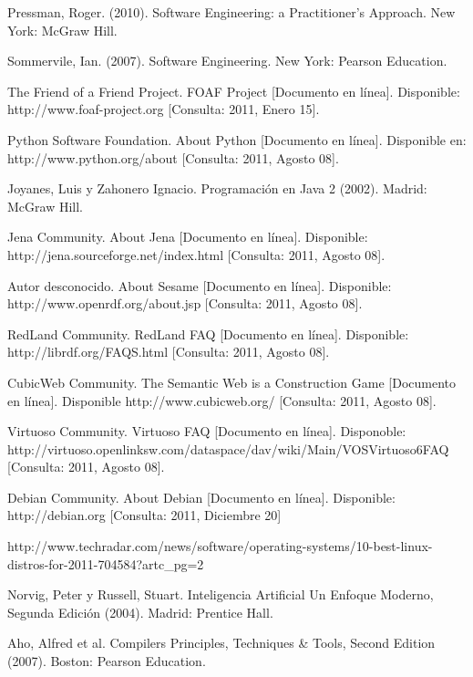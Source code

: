 \begin{thebibliography}{20}
 Pressman, Roger. (2010). Software Engineering: a Practitioner's Approach. New York: McGraw Hill.

 Sommervile, Ian. (2007). Software Engineering. New York: Pearson Education.

 The Friend of a Friend Project. FOAF Project [Documento en línea]. Disponible: http://www.foaf-project.org [Consulta: 2011, Enero 15].

 Python Software Foundation. About Python [Documento en línea]. Disponible en: http://www.python.org/about [Consulta: 2011, Agosto 08].

 Joyanes, Luis y Zahonero Ignacio. Programación en Java 2 (2002). Madrid: McGraw Hill.

 Jena Community. About Jena [Documento en línea]. Disponible: http://jena.sourceforge.net/index.html [Consulta: 2011, Agosto 08].

 Autor desconocido. About Sesame [Documento en línea]. Disponible: http://www.openrdf.org/about.jsp [Consulta: 2011, Agosto 08].

 RedLand Community. RedLand FAQ [Documento en línea]. Disponible: http://librdf.org/FAQS.html [Consulta: 2011, Agosto 08].

 CubicWeb Community. The Semantic Web is a Construction Game [Documento en línea]. Disponible http://www.cubicweb.org/ [Consulta: 2011, Agosto 08].

 Virtuoso Community. Virtuoso FAQ [Documento en línea]. Disponoble: http://virtuoso.openlinksw.com/dataspace/dav/wiki/Main/VOSVirtuoso6FAQ [Consulta: 2011, Agosto 08].

 Debian Community. About Debian [Documento en línea]. Disponible: http://debian.org [Consulta: 2011, Diciembre 20]

 http://www.techradar.com/news/software/operating-systems/10-best-linux-distros-for-2011-704584?artc\_pg=2

 Norvig, Peter y Russell, Stuart. Inteligencia Artificial Un Enfoque Moderno, Segunda Edición (2004). Madrid: Prentice Hall.

 Aho, Alfred et al. Compilers Principles, Techniques & Tools, Second Edition (2007). Boston: Pearson Education.

\end{thebibliography}
